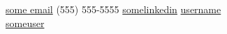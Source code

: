 \documentclass{article}
\begin{document}
\noindent\raisebox{-0.3\height}{\LARGE \faInbox} \href{some email}{some email} \quad
\raisebox{-0.3\height}{\LARGE \faPhone} (555) 555-5555 \quad
\raisebox{-0.3\height}{\LARGE \faLinkedinSquare} \href{https://www.linkedin.com/in/somelinkedin/}{somelinkedin} \quad
\raisebox{-0.3\height}{\LARGE \faGithub} \href{https://github.com/username}{username} \\
\raisebox{-0.3\height}{\LARGE \faStackOverflow} \href{https://stackoverflow.com/users/12584129/someuser}{someuser} \quad
\end{document}
